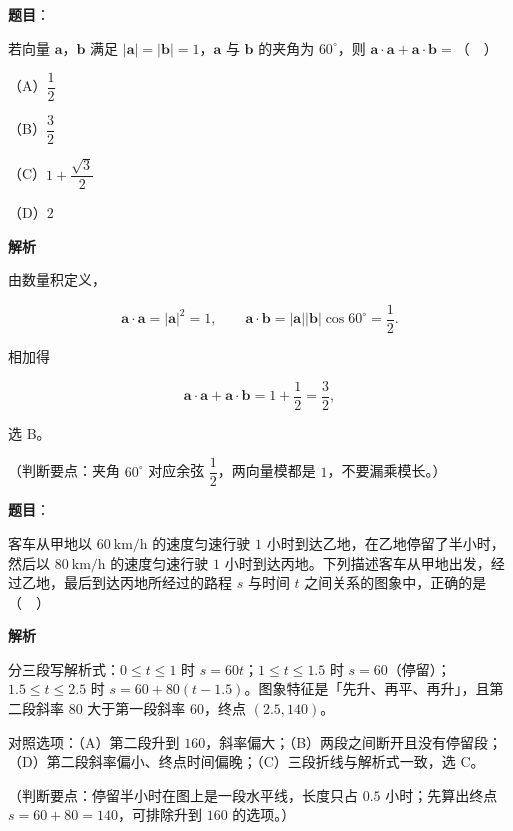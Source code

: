 \begin{answer}

\textbf{题目}：

若向量 $\boldsymbol a$，$\boldsymbol b$ 满足 $|\boldsymbol a|=|\boldsymbol b|=1$，$\boldsymbol a$ 与 $\boldsymbol b$ 的夹角为 $60^\circ$，则 $\boldsymbol a\cdot\boldsymbol a+\boldsymbol a\cdot\boldsymbol b=$（　）

（A）$\dfrac12$

（B）$\dfrac32$

（C）$1+\dfrac{\sqrt3}{2}$

（D）$2$

\textbf{解析}

由数量积定义，

\nopagebreak[4]
\[\boldsymbol a\cdot\boldsymbol a=|\boldsymbol a|^2=1,\qquad \boldsymbol a\cdot\boldsymbol b=|\boldsymbol a||\boldsymbol b|\cos60^\circ=\frac12.\]

相加得

\nopagebreak[4]
\[\boldsymbol a\cdot\boldsymbol a+\boldsymbol a\cdot\boldsymbol b=1+\frac12=\frac32,\]

选 B。

（判断要点：夹角 $60^\circ$ 对应余弦 $\dfrac12$，两向量模都是 $1$，不要漏乘模长。）


\end{answer}
\begin{answer}

\textbf{题目}：

客车从甲地以 $60\ \mathrm{km/h}$ 的速度匀速行驶 $1$ 小时到达乙地，在乙地停留了半小时，然后以 $80\ \mathrm{km/h}$ 的速度匀速行驶 $1$ 小时到达丙地。下列描述客车从甲地出发，经过乙地，最后到达丙地所经过的路程 $s$ 与时间 $t$ 之间关系的图象中，正确的是（　）
\nopagebreak[4]
\begin{center}\end{center}
\nopagebreak[4]
\textbf{解析}

分三段写解析式：$0\leqslant t\leqslant1$ 时 $s=60t$；$1\leqslant t\leqslant1.5$ 时 $s=60$（停留）；$1.5\leqslant t\leqslant2.5$ 时 $s=60+80(t-1.5)$。图象特征是「先升、再平、再升」，且第二段斜率 $80$ 大于第一段斜率 $60$，终点 $(2.5,140)$。

对照选项：（A）第二段升到 $160$，斜率偏大；（B）两段之间断开且没有停留段；（D）第二段斜率偏小、终点时间偏晚；（C）三段折线与解析式一致，选 C。

（判断要点：停留半小时在图上是一段水平线，长度只占 $0.5$ 小时；先算出终点 $s=60+80=140$，可排除升到 $160$ 的选项。）


\end{answer}
